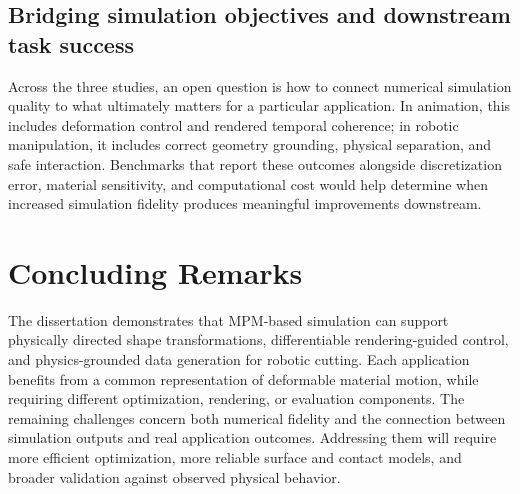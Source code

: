 \subsection{Bridging simulation objectives and downstream task success}
Across the three studies, an open question is how to connect numerical simulation quality to what ultimately matters for a particular application. In animation, this includes deformation control and rendered temporal coherence; in robotic manipulation, it includes correct geometry grounding, physical separation, and safe interaction. Benchmarks that report these outcomes alongside discretization error, material sensitivity, and computational cost would help determine when increased simulation fidelity produces meaningful improvements downstream.

\section{Concluding Remarks}
The dissertation demonstrates that MPM-based simulation can support physically directed shape transformations, differentiable rendering-guided control, and physics-grounded data generation for robotic cutting. Each application benefits from a common representation of deformable material motion, while requiring different optimization, rendering, or evaluation components. The remaining challenges concern both numerical fidelity and the connection between simulation outputs and real application outcomes. Addressing them will require more efficient optimization, more reliable surface and contact models, and broader validation against observed physical behavior.
